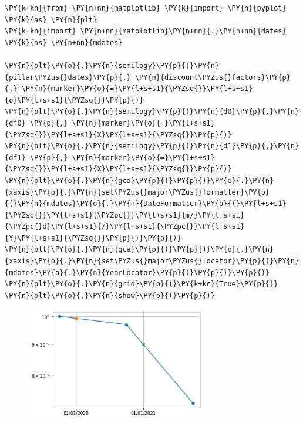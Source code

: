\begin{tcolorbox}[breakable, size=fbox, boxrule=1pt, pad at break*=1mm,colback=cellbackground, colframe=cellborder]
\begin{Verbatim}[commandchars=\\\{\}]
\PY{k+kn}{from} \PY{n+nn}{matplotlib} \PY{k}{import} \PY{n}{pyplot} \PY{k}{as} \PY{n}{plt}
\PY{k+kn}{import} \PY{n+nn}{matplotlib}\PY{n+nn}{.}\PY{n+nn}{dates} \PY{k}{as} \PY{n+nn}{mdates}

\PY{n}{plt}\PY{o}{.}\PY{n}{semilogy}\PY{p}{(}\PY{n}{pillar\PYZus{}dates}\PY{p}{,} \PY{n}{discount\PYZus{}factors}\PY{p}{,} \PY{n}{marker}\PY{o}{=}\PY{l+s+s1}{\PYZsq{}}\PY{l+s+s1}{o}\PY{l+s+s1}{\PYZsq{}}\PY{p}{)}
\PY{n}{plt}\PY{o}{.}\PY{n}{semilogy}\PY{p}{(}\PY{n}{d0}\PY{p}{,}\PY{n}{df0} \PY{p}{,} \PY{n}{marker}\PY{o}{=}\PY{l+s+s1}{\PYZsq{}}\PY{l+s+s1}{X}\PY{l+s+s1}{\PYZsq{}}\PY{p}{)}
\PY{n}{plt}\PY{o}{.}\PY{n}{semilogy}\PY{p}{(}\PY{n}{d1}\PY{p}{,}\PY{n}{df1} \PY{p}{,} \PY{n}{marker}\PY{o}{=}\PY{l+s+s1}{\PYZsq{}}\PY{l+s+s1}{X}\PY{l+s+s1}{\PYZsq{}}\PY{p}{)}
\PY{n}{plt}\PY{o}{.}\PY{n}{gca}\PY{p}{(}\PY{p}{)}\PY{o}{.}\PY{n}{xaxis}\PY{o}{.}\PY{n}{set\PYZus{}major\PYZus{}formatter}\PY{p}{(}\PY{n}{mdates}\PY{o}{.}\PY{n}{DateFormatter}\PY{p}{(}\PY{l+s+s1}{\PYZsq{}}\PY{l+s+s1}{\PYZpc{}}\PY{l+s+s1}{m/}\PY{l+s+si}{\PYZpc{}d}\PY{l+s+s1}{/}\PY{l+s+s1}{\PYZpc{}}\PY{l+s+s1}{Y}\PY{l+s+s1}{\PYZsq{}}\PY{p}{)}\PY{p}{)}
\PY{n}{plt}\PY{o}{.}\PY{n}{gca}\PY{p}{(}\PY{p}{)}\PY{o}{.}\PY{n}{xaxis}\PY{o}{.}\PY{n}{set\PYZus{}major\PYZus{}locator}\PY{p}{(}\PY{n}{mdates}\PY{o}{.}\PY{n}{YearLocator}\PY{p}{(}\PY{p}{)}\PY{p}{)}
\PY{n}{plt}\PY{o}{.}\PY{n}{grid}\PY{p}{(}\PY{k+kc}{True}\PY{p}{)}
\PY{n}{plt}\PY{o}{.}\PY{n}{show}\PY{p}{(}\PY{p}{)}
\end{Verbatim}
\end{tcolorbox}
\vfill
\begin{figure}[h]
  \centering
  \includegraphics[width=0.7\textwidth]{figures/lecture_3_15_0.png}
\end{figure}

